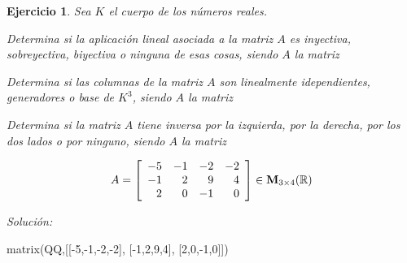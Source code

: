 \documentclass[12pt]{amsart}
\newtheorem{ejer}{Ejercicio}
\begin{document}
\begin{ejer} Sea $K$ el cuerpo de los n\'umeros reales.
\newline
\noindent\begin{minipage}{\textwidth}
\begin{tcolorbox}[colback = green!20!white,title=Versión Aplicaciones]
Determina si la aplicaci\'on lineal asociada a la matriz $A$ es inyectiva, sobreyectiva, biyectiva o ninguna de esas cosas, siendo $A$ la matriz \end{tcolorbox}
\end{minipage} \newline
\noindent\begin{minipage}{\textwidth}
\begin{tcolorbox}[colback = blue!20!white,title=Versión Vectores]
Determina si las columnas de la matriz $A$ son linealmente idependientes, generadores o base de $K^{3}$, siendo $A$ la matriz \end{tcolorbox}
\end{minipage} \newline
\noindent\begin{minipage}{\textwidth} 
\begin{tcolorbox}[colback = red!20!white,title=Versión Inversas]
Determina si la matriz $A$ tiene inversa por la izquierda, por la derecha, por los dos lados o por ninguno, siendo $A$ la matriz 
\end{tcolorbox}
\end{minipage}
\[ A = \left[\begin{array}{rrrr}
-5 & -1 & -2 & -2 \\
-1 & 2 & 9 & 4 \\
2 & 0 & -1 & 0
\end{array}\right] \in {\bf M}_{3\times 4}({\mathbb R})\]
\end{ejer}

{\it Soluci\'on:}

\begin{sageblock}
matrix(QQ,[[-5,-1,-2,-2],
[-1,2,9,4],
[2,0,-1,0]])
\end{sageblock}

\end{document}

